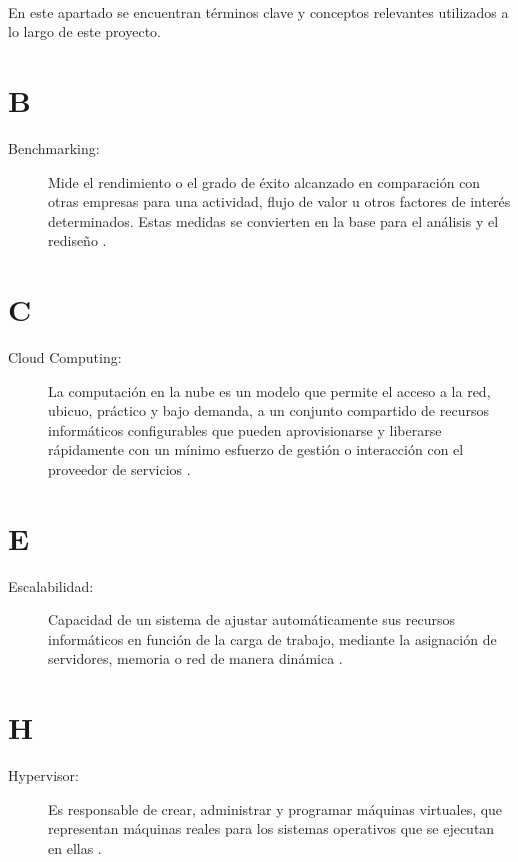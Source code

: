 \label{cap:glosario}
\mbox{}\\
En este apartado se encuentran términos clave y conceptos relevantes utilizados a lo largo de este proyecto.

\section*{B}
\begin{description}
  \item[Benchmarking:] Mide el rendimiento o el grado de éxito alcanzado en comparación con otras empresas para una actividad, flujo de valor u otros factores de interés determinados. Estas medidas se convierten en la base para el análisis y el rediseño \citep{PeterWootton2024}.
\end{description}

\section*{C}
\begin{description}
  \item[Cloud Computing:] La computación en la nube es un modelo que permite el acceso a la red, ubicuo, práctico y bajo demanda, a un conjunto compartido de recursos informáticos configurables que pueden aprovisionarse y liberarse rápidamente con un mínimo esfuerzo de gestión o interacción con el proveedor de servicios \citep{Mell2011}.
\end{description}

\section*{E}
\begin{description}
  \item[Escalabilidad:] Capacidad de un sistema de ajustar automáticamente sus recursos informáticos en función de la carga de trabajo, mediante la asignación de servidores, memoria o red de manera dinámica \citep{TARI2024100650}.
\end{description}

\section*{H}
\begin{description}
  \item[Hypervisor:] Es responsable de crear, administrar y programar máquinas virtuales, que representan máquinas reales para los sistemas operativos que se ejecutan en ellas \citep{Cinque2024}.
\end{description}

